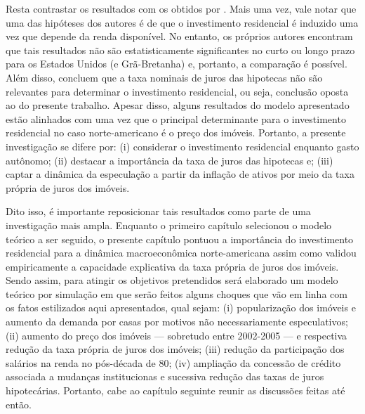Resta contrastar os resultados com os obtidos por \textcite{arestis_residential_2015}. Mais uma vez, vale notar que uma das hipóteses dos autores é de que o investimento residencial é induzido uma vez que depende da renda disponível. No entanto, os próprios autores encontram que tais resultados não são estatisticamente significantes no curto ou longo prazo para os Estados Unidos (e Grã-Bretanha) e, portanto, a comparação é possível. Além disso, concluem que a taxa nominais de juros das hipotecas não são relevantes para determinar o investimento residencial, ou seja, conclusão oposta ao do presente trabalho. Apesar disso, alguns resultados do modelo apresentado estão alinhados com \textcite{arestis_residential_2015} uma vez que o principal determinante para o investimento residencial no caso norte-americano é o preço dos imóveis. Portanto, a presente investigação se difere por: (i) considerar o investimento residencial enquanto gasto autônomo; (ii) destacar a importância da taxa de juros das hipotecas e; (iii) captar a dinâmica da especulação a partir da inflação de ativos por meio da taxa própria de juros dos imóveis.  

Dito isso, é importante reposicionar tais resultados como parte de uma investigação mais ampla.
Enquanto o primeiro capítulo selecionou o modelo teórico a ser seguido, o presente capítulo pontuou a importância do investimento residencial para a dinâmica macroeconômica norte-americana assim como validou empiricamente a capacidade explicativa da taxa própria de juros dos imóveis.
Sendo assim, para atingir os objetivos pretendidos será elaborado um modelo teórico por simulação em que serão feitos alguns choques que vão em linha com os fatos estilizados aqui apresentados, qual sejam:
(i) popularização dos imóveis e aumento da demanda por casas por motivos não necessariamente especulativos;
(ii) aumento do preço dos imóveis --- sobretudo entre 2002-2005 --- e respectiva redução da taxa própria de juros dos imóveis;
(iii) redução da participação dos salários na renda no pós-década de 80;
(iv) ampliação da concessão de crédito associada a mudanças institucionas e sucessiva redução das taxas de juros hipotecárias.
Portanto, cabe ao capítulo seguinte reunir as discussões feitas até então.



